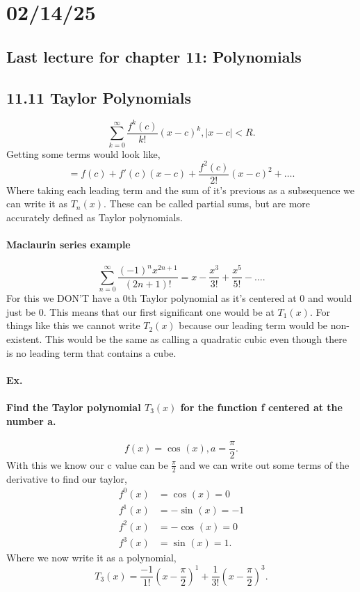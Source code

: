 \section*{02/14/25}%
\label{sec:02/14/25}

\subsection*{Last lecture for chapter 11: Polynomials}%
\label{sub:Last lecture for chapter 11}
\subsection*{11.11 Taylor Polynomials}%
\label{sub:11.11 Taylor Polynomials}

\[
\sum_{k=0}^{\infty} \frac{ f^{ k }\left( c \right)  }{ k! }(x-c)^k , \left| x-c \right| < R
.\] 
Getting some terms would look like,
\[
= f\left( c \right) + f'\left( c \right) (x-c) + \frac{ f^{ 2 }\left( c \right)  }{ 2! }(x-c)^2 + \ldots
.\] 
Where taking each leading term and the sum of it's previous as a subsequence we can write it as $ T_n\left( x \right)  $. These can be called partial sums, but are more accurately defined as Taylor polynomials.

\paragraph{Maclaurin series example}
\[
\sum_{ n=0 } ^{ \infty } \frac{ \left( -1 \right) ^{ n } x^{ 2n+1 }}{ \left( 2n+1 \right) ! }= x - \frac{ x^3 }{ 3! } + \frac{ x^5 }{ 5! } - \ldots
.\] 
For this we DON'T have a 0th Taylor polynomial as it's centered at 0 and would just be 0. This means that our first significant one would be at $ T_1\left( x \right)  $. For things like this we cannot write $ T_2\left( x \right)  $ because our leading term would be non-existent. This would be the same as calling a quadratic cubic even though there is no leading term that contains a cube. 

\paragraph{Ex.}
\paragraph{Find the Taylor polynomial $ T_3\left( x \right)  $ for the function f centered at the number a. }
\[
f\left( x \right) =\cos^{  } \left( x \right) , a=\frac{ \pi }{ 2 } 
.\] 
With this we know our c value can be $ \frac{ \pi }{ 2 }  $ and we can write out some terms of the derivative to find our taylor,
\begin{align*}
	f^{ 0 }\left( x \right) &=\cos^{  } \left( x \right) = 0\\
	f^{ 1 }\left( x \right) &= -\sin^{  } \left( x \right) =-1 \\
	f^{ 2 }\left( x \right) &= -\cos^{  } \left( x \right) =0 \\
	f^{ 3 }\left( x \right) &= \sin^{  } \left( x \right) =1 
.\end{align*}
Where we now write it as a polynomial,
\[
T_3\left( x \right) = \frac{ -1 }{ 1! }\left( x-\frac{ \pi }{ 2 }  \right) ^{ 1 }+ \frac{ 1 }{ 3! } \left( x-\frac{ \pi }{ 2 }  \right) ^3
.\] 
